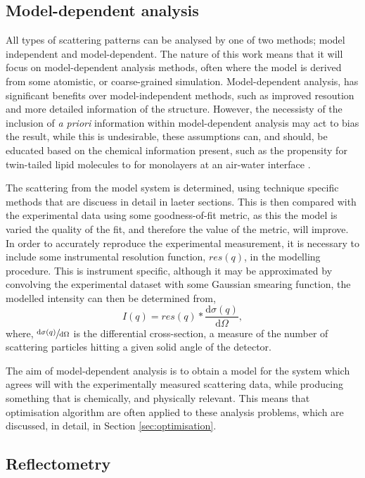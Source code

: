 \subsection{Model-dependent analysis}

All types of scattering patterns can be analysed by one of two methods; model independent and model-dependent.
The nature of this work means that it will focus on model-dependent analysis methods, often where the model is derived from some atomistic, or coarse-grained simulation. Model-dependent analysis, has significant benefits over model-independent methods, such as improved resoution and more detailed information of the structure.
However, the necessisty of the inclusion of \emph{a priori} information within model-dependent analysis may act to bias the result, while this is undesirable, these assumptions can, and should, be educated based on the chemical information present, such as the propensity for twin-tailed lipid molecules to for monolayers at an air-water interface \cite{McCluskey2018}.

The scattering from the model system is determined, using technique specific methods that are discuess in detail in laeter sections.
This is then compared with the experimental data using some goodness-of-fit metric, as this the model is varied the quality of the fit, and therefore the value of the metric, will improve.
In order to accurately reproduce the experimental measurement, it is necessary to include some instrumental resolution function, $res(q)$, in the modelling procedure.
This is instrument specific, although it may be approximated by convolving the experimental dataset with some Gaussian smearing function, the modelled intensity can then be determined from,
%
\begin{equation}
	I(q) = res(q) * \frac{\text{d}\sigma(q)}{\text{d}\Omega},
\end{equation}
%
where, $\sfrac{\text{d}\sigma(q)}{\text{d}\Omega}$ is the differential cross-section, a measure of the number of scattering particles hitting a given solid angle of the detector.

The aim of model-dependent analysis is to obtain a model for the system which agrees will with the experimentally measured scattering data, while producing something that is chemically, and physically relevant.
This means that optimisation algorithm are often applied to these analysis problems, which are discussed, in detail, in Section \ref{sec:optimisation}.

\subsection{Reflectometry}

